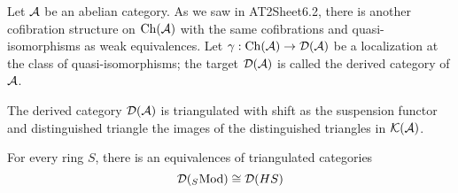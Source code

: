 \begin{example}
Let $\mathcal{A}$ be an abelian category. As we saw in AT2Sheet6.2, there is another cofibration structure on $\operatorname{Ch}(\mathcal{A})$ with the same cofibrations and quasi-isomorphisms as weak equivalences. Let $\gamma:\operatorname{Ch}(\mathcal{A})\to\mathcal{D}(\mathcal{A})$ be a localization at the class of quasi-isomorphisms; the target $\mathcal{D}(\mathcal{A})$ is called the derived category of $\mathcal{A}$.

The derived category $\mathcal{D}(\mathcal{A})$ is triangulated with shift as the suspension functor and distinguished triangle the images of the distinguished triangles in $\mathcal{K}(\mathcal{A})$.
\end{example}

\begin{theorem}
For every ring $S$, there is an equivalences of triangulated categories
\[\mathcal{D}({}_{S\!}\operatorname{Mod})\cong\mathcal{D}(HS)\]
\end{theorem}

